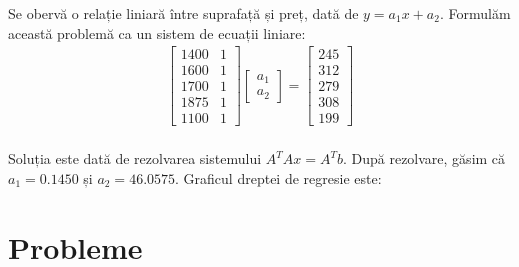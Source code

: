 \documentclass{exam}
\begin{document}
Se obervă o relație liniară între suprafață și preț, dată de $y = a_1 x + a_2$.
Formulăm această problemă ca un sistem de ecuații liniare:
\begin{align*}
	\begin{bmatrix}
		1400 & 1 \\
		1600 & 1 \\
		1700 & 1 \\
		1875 & 1 \\
		1100 & 1
	\end{bmatrix}
	\begin{bmatrix}
		a_1 \\
		a_2
	\end{bmatrix}
	=
	\begin{bmatrix}
		245 \\
		312 \\
		279 \\
		308 \\
		199
	\end{bmatrix} \\
\end{align*}

Soluția este dată de rezolvarea sistemului $A^T A x = A^T b$. După rezolvare,
găsim că $a_1 = 0.1450$ și $a_2 = 46.0575$. Graficul dreptei de regresie este:
\begin{center}
\end{center}


\section{Probleme}
\end{document}
